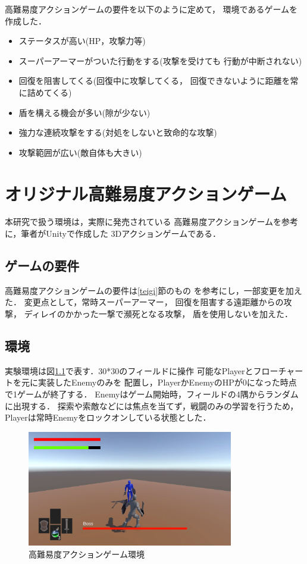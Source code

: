 \documentclass[a4paper,12pt,oneside,openany,titlepage]{jreport}
\begin{document}
 高難易度アクションゲームの要件を以下のように定めて，
 環境であるゲームを作成した．
 {
\begin{itemize}[itemsep=1pt, leftmargin=27pt, labelsep=5pt, parsep=0pt]
  \item ステータスが高い(HP，攻撃力等)
  \item スーパーアーマーがついた行動をする(攻撃を受けても
  行動が中断されない)
  \item 回復を阻害してくる(回復中に攻撃してくる，
  回復できないように距離を常に詰めてくる)
  \item 盾を構える機会が多い(隙が少ない)
  \item 強力な連続攻撃をする(対処をしないと致命的な攻撃)
  \item 攻撃範囲が広い(敵自体も大きい)
\end{itemize}
}
\newpage



\chapter{オリジナル高難易度アクションゲーム}
 \thispagestyle{fancy}
 \lhead{\leftmark}
 \rhead{\thepage}
 \renewcommand{\headrulewidth}{1pt}


 本研究で扱う環境は，実際に発売されている
 高難易度アクションゲームを参考に，筆者がUnity\cite{unity}で作成した
 3Dアクションゲームである．
 
 \section{ゲームの要件}
 高難易度アクションゲームの要件は\ref{teigi}節のもの
 を参考にし，一部変更を加えた．
 変更点として，常時スーパーアーマー，
 回復を阻害する遠距離からの攻撃，
 ディレイのかかった一撃で瀕死となる攻撃，
 盾を使用しないを加えた．
 
 \section{環境}
 実験環境は図\ref{kankyou}で表す．30*30のフィールドに操作
 可能なPlayerとフローチャートを元に実装したEnemyのみを
 配置し，PlayerかEnemyのHPが0になった時点で1ゲームが終了する．
 Enemyはゲーム開始時，フィールドの4隅からランダムに出現する．
 探索や索敵などには焦点を当てず，戦闘のみの学習を行うため，
 Playerは常時Enemyをロックオンしている状態とした．

 
 \begin{figure}[h]
   \begin{center}
     \includegraphics[width=9cm]{ActionGameImage.png}
     \caption{高難易度アクションゲーム環境}
     \label{kankyou}
   \end{center}
 \end{figure}
 
\end{document}
